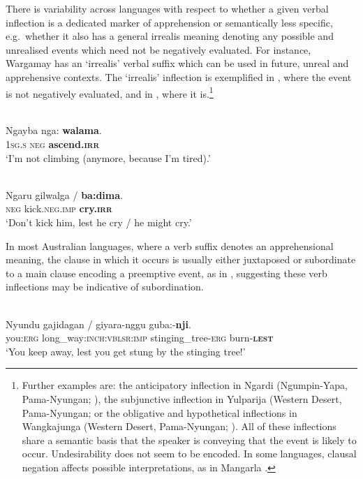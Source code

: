\documentclass[output=paper,colorlinks,citecolor=brown]{langscibook}
\begin{document}
\largerpage
 There is variability across languages with respect to whether a given verbal inflection is a dedicated marker of apprehension or semantically less specific, e.g.\   whether it also has a general irrealis meaning denoting any possible and unrealised events which need not be negatively evaluated. For instance, Wargamay has an `irrealis' verbal suffix which can be used in future, unreal and apprehensive contexts. The `irrealis' inflection is exemplified in , where the event is not negatively evaluated, and in , where it is.\footnote{Further examples are: the anticipatory inflection in Ngardi (Ngumpin-Yapa, Pama-Nyungan; \cite{ennever_nominal_2018}), the subjunctive inflection in Yulparija (Western Desert, Pama-Nyungan; \citep[39]{burridge_yulparija_1996} or the obligative and hypothetical inflections in Wangkajunga (Western Desert, Pama-Nyungan; \cite[201--202]{jones_grammar_2011}). All of these inflections share a semantic basis that the speaker is conveying that the event is likely to occur. Undesirability does not seem to be encoded. In some languages, clausal negation affects possible interpretations, as in Mangarla \citep[335--339]{agnew_core_2020}.}

\ea
{} \\
\gll Ngayba nga: \textbf{walama}. \\
\textsc{1sg.s} \textsc{neg} \textbf{ascend.\textsc{irr}} \\
\glt `I'm not climbing (anymore, because I'm tired).'
\label{ex:bro9}
\z

\ea
{} \\
\gll Ngaru {gilwalga \textnormal{/}} \textbf{ba:dima}. \\
\textsc{neg} kick.\textsc{neg.imp} \textbf{cry.\textsc{irr}} \\
\glt `Don't kick him, lest he cry / he might cry.'
\label{ex:bro10}
\z

In most Australian languages, where a verb suffix denotes an apprehensional meaning, the clause in which it occurs is usually either juxtaposed or subordinate to a main clause encoding a preemptive event, as in , suggesting these verb inflections may be indicative of subordination.


\ea 
{} {\citealt[351]{dixon_grammar_1977}} \\
\gll Nyundu {gajidagan \textnormal{/}} giyara-nggu guba:-\textbf{nji}. \\
you:\textsc{erg} long\_way:\textsc{inch:vblsr:imp} stinging\_tree-\textsc{erg} burn-\textbf{\textsc{lest}} \\
\glt `You keep away, lest you get stung by the stinging tree!'
\label{ex:bro11}
\z
\end{document}
